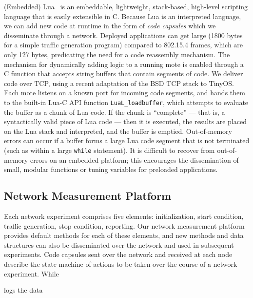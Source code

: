 (Embedded) Lua~\cite{elua} is an embeddable, lightweight, stack-based, high-level scripting language that is easily extensible in C.
Because Lua is an interpreted language, we can add new code at runtime in the form of \emph{code capsules} which we disseminate through a network.
Deployed applications can get large (1800 bytes for a simple traffic generation program) compared to 802.15.4 frames, which are only 127 bytes, predicating the need for a code reassembly mechanism.
The mechanism for dynamically adding logic to a running mote is enabled through a C function that accepts string buffers that contain segments of code.
We deliver code over TCP, using a recent adaptation of the BSD TCP stack to TinyOS.
Each mote listens on a known port for incoming code segments, and hands them to the built-in Lua-C API function \texttt{LuaL\_loadbuffer}, which attempts to evaluate the buffer as a chunk of Lua code.
If the chunk is ``complete'' --- that is, a syntactically valid piece of Lua code --- then it is executed, the results are placed on the Lua stack and interpreted, and the buffer is emptied.
Out-of-memory errors can occur if a buffer forms a large Lua code segment that is not terminated (such as within a large \texttt{while} statement).
It is difficult to recover from out-of-memory errors on an embedded platform; this encourages the dissemination of small, modular functions or tuning variables for preloaded applications.


\subsection{Network Measurement Platform}

Each network experiment comprises five elements: initialization, start condition, traffic generation, stop condition, reporting.
Our network measurement platform provides default methods for each of these elements, and new methods and data structures can also be disseminated over the network and used in subsequent experiments.
Code capsules sent over the network and received at each node describe the state machine of actions to be taken over the course of a network experiment.
While

logs the data


